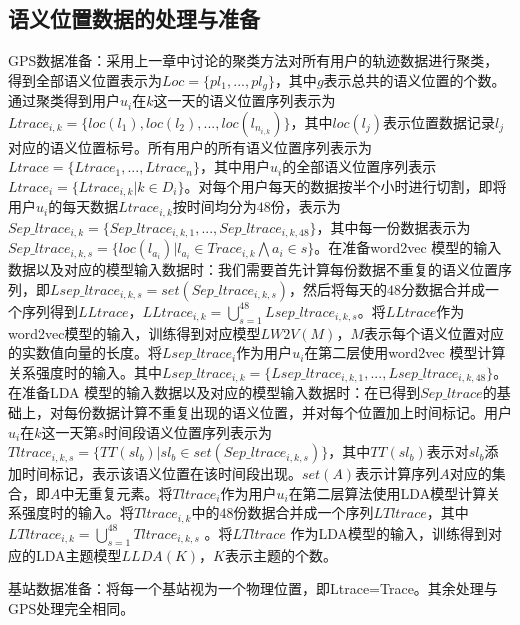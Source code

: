 \subsection{语义位置数据的处理与准备}
GPS数据准备：采用上一章中讨论的聚类方法对所有用户的轨迹数据进行聚类，得到全部语义位置表示为$Loc=\{pl_{1},...,pl_{g}\}$，其中$g$表示总共的语义位置的个数。通过聚类得到用户$u_{i}$在$k$这一天的语义位置序列表示为$Ltrace_{i,k}=\{loc(l_{1}),loc(l_{2}),...,loc(l_{n_{i,k}})\}$，其中$loc(l_{j})$表示位置数据记录$l_{j}$对应的语义位置标号。所有用户的所有语义位置序列表示为$Ltrace=\{Ltrace_{1},...,Ltrace_{n}\}$，其中用户$u_{i}$的全部语义位置序列表示$Ltrace_{i}=\{Ltrace_{i,k}|k\in D_{i}\}$。对每个用户每天的数据按半个小时进行切割，即将用户$u_{i}$的每天数据$Ltrace_{i,k}$按时间均分为$48$份，表示为$Sep\_ltrace_{i,k}=\{Sep\_ltrace_{i,k,1},...,Sep\_ltrace_{i,k,48}\}$，其中每一份数据表示为$Sep\_ltrace_{i,k,s}=\{loc(l_{a_{i}})|l_{a_{i}}\in Trace_{i,k}\bigwedge a_{i}\in s\}$。在准备word2vec 模型的输入数据以及对应的模型输入数据时：我们需要首先计算每份数据不重复的语义位置序列，即$Lsep\_ltrace_{i,k,s}=set(Sep\_ltrace_{i,k,s})$，然后将每天的$48$分数据合并成一个序列得到$LLtrace$，$LLtrace_{i,k}=\bigcup_{s=1}^{48}Lsep\_ltrace_{i,k,s}$。将$LLtrace$作为word2vec模型的输入，训练得到对应模型$LW2V(M)$，$M$表示每个语义位置对应的实数值向量的长度。将$Lsep\_ltrace_{i}$作为用户$u_{i}$在第二层使用word2vec 模型计算关系强度时的输入。其中$Lsep\_ltrace_{i,k}=\{Lsep\_ltrace_{i,k,1},...,Lsep\_ltrace_{i,k,48}\}$。在准备LDA 模型的输入数据以及对应的模型输入数据时：在已得到$Sep\_ltrace$的基础上，对每份数据计算不重复出现的语义位置，并对每个位置加上时间标记。用户$u_{i}$在$k$这一天第$s$时间段语义位置序列表示为$Tltrace_{i,k,s}=\{TT(sl_{b})|sl_b\in set(Sep\_ltrace_{i,k,s})\}$，其中$TT(sl_{b})$表示对$sl_{b}$添加时间标记，表示该语义位置在该时间段出现。$set(A)$表示计算序列$A$对应的集合，即$A$中无重复元素。将$Tltrace_{i}$作为用户$u_{i}$在第二层算法使用LDA模型计算关系强度时的输入。将$Tltrace_{i,k}$中的$48$份数据合并成一个序列$LTltrace$，其中$LTltrace_{i,k}=\bigcup_{s=1}^{48}Tltrace_{i,k,s}$ 。将$LTltrace$ 作为LDA模型的输入，训练得到对应的LDA主题模型$LLDA(K)$，$K$表示主题的个数。
\par 基站数据准备：将每一个基站视为一个物理位置，即Ltrace=Trace。其余处理与GPS处理完全相同。
